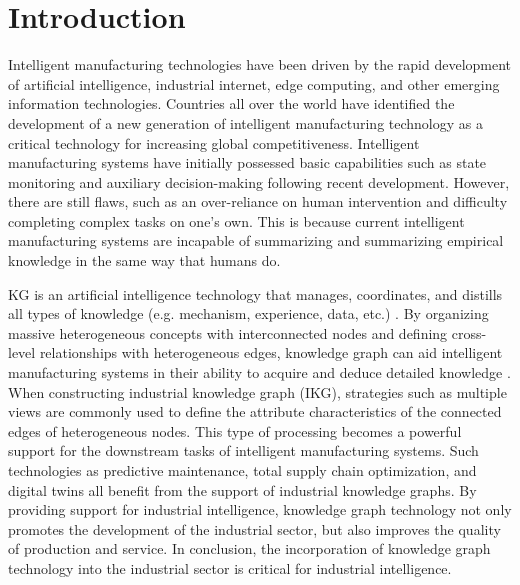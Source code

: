 \documentclass[11pt]{article}
\begin{document}
\section{Introduction}

\par{Intelligent manufacturing technologies have been driven by the rapid development of artificial intelligence, industrial internet, edge computing, and other emerging information technologies.
Countries all over the world have identified the development of a new generation of intelligent manufacturing technology as a critical technology for increasing global competitiveness.
Intelligent manufacturing systems have initially possessed basic capabilities such as state monitoring and auxiliary decision-making following recent development.
However, there are still flaws, such as an over-reliance on human intervention and difficulty completing complex tasks on one's own.
This is because current intelligent manufacturing systems are incapable of summarizing and summarizing empirical knowledge in the same way that humans do.
}

\par{KG is an artificial intelligence technology that manages, coordinates, and distills all types of knowledge (e.g. mechanism, experience, data, etc.) \cite{bib1}.
By organizing massive heterogeneous concepts with interconnected nodes and defining cross-level relationships with heterogeneous edges, knowledge graph can aid intelligent manufacturing systems in their ability to acquire and deduce detailed knowledge \cite{bib2}.
When constructing industrial knowledge graph (IKG), strategies such as multiple views are commonly used to define the attribute characteristics of the connected edges of heterogeneous nodes\cite{bib3}.
This type of processing becomes a powerful support for the downstream tasks of intelligent manufacturing systems.
Such technologies as predictive maintenance, total supply chain optimization, and digital twins all benefit from the support of industrial knowledge graphs.
By providing support for industrial intelligence, knowledge graph technology not only promotes the development of the industrial sector, but also improves the quality of production and service.
In conclusion, the incorporation of knowledge graph technology into the industrial sector is critical for industrial intelligence.}
\end{document}
